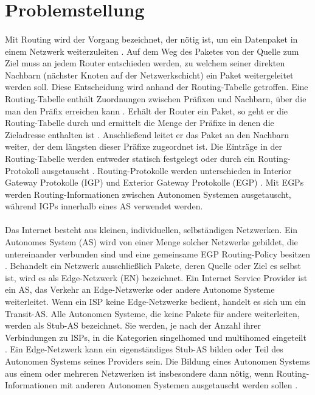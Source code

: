\section{Problemstellung}
\paragraph{}
Mit Routing wird der Vorgang bezeichnet, der nötig ist, um ein Datenpaket in einem Netzwerk weiterzuleiten \cite{Mahorta:2002:IR}. Auf dem Weg des Paketes von der Quelle zum Ziel muss an jedem Router entschieden werden, zu welchem seiner direkten Nachbarn (nächster Knoten auf der Netzwerkschicht) ein Paket weitergeleitet werden soll. Diese Entscheidung wird anhand der Routing-Tabelle getroffen. Eine Routing-Tabelle enthält Zuordnungen zwischen Präfixen und Nachbarn, über die man den Präfix erreichen kann \cite{Mahorta:2002:IR}. Erhält der Router ein Paket, so geht er die Routing-Tabelle durch und ermittelt die Menge der Präfixe in denen die Zieladresse enthalten ist \cite{Tanenbaum:2003:CN}. Anschließend leitet er das Paket an den Nachbarn weiter, der dem längsten dieser Präfixe zugeordnet ist. Die Einträge in der Routing-Tabelle werden entweder statisch festgelegt oder durch ein Routing-Protokoll ausgetauscht \cite{Mahorta:2002:IR}. Routing-Protokolle werden unterschieden in Interior Gateway Protokolle (IGP) und Exterior Gateway Protokolle (EGP) \cite{Tanenbaum:2003:CN}. Mit EGPs werden Routing-Informationen zwischen Autonomen Systemen ausgetauscht, während IGPs innerhalb eines AS verwendet werden.  %

\paragraph{}
Das Internet besteht aus kleinen, individuellen, selbständigen Netzwerken. Ein Autonomes System (AS) wird von einer Menge solcher Netzwerke gebildet, die untereinander verbunden sind und eine gemeinsame EGP Routing-Policy besitzen \cite{hawkinson:1996:autnomousSystems}. Behandelt ein Netzwerk ausschließlich Pakete, deren Quelle oder Ziel es selbst ist,  wird es als Edge-Netzwerk (EN) bezeichnet. Ein Internet Service Provider ist ein AS, das Verkehr an Edge-Netzwerke oder andere Autonome Systeme weiterleitet. Wenn ein ISP keine Edge-Netzwerke bedient, handelt es sich um ein Transit-AS. Alle Autonomen Systeme, die keine Pakete für andere weiterleiten, werden als Stub-AS bezeichnet. Sie werden, je nach der Anzahl ihrer Verbindungen zu ISPs, in die Kategorien singelhomed und multihomed eingeteilt \cite{Mahorta:2002:IR}. Ein Edge-Netzwerk kann ein eigenständiges Stub-AS bilden oder Teil des Autonomen Systems seines Providers sein. Die Bildung eines Autonomen Systems aus einem oder mehreren Netzwerken ist insbesondere dann nötig, wenn Routing-Informationen mit anderen Autonomen Systemen ausgetauscht werden sollen \cite{hawkinson:1996:autnomousSystems}.

